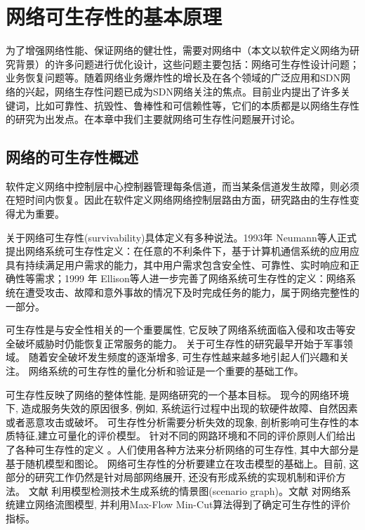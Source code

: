 
\chapter{网络可生存性的基本原理}
为了增强网络性能、保证网络的健壮性，需要对网络中（本文以软件定义网络为研究背景）的许多问题进行优化设计，这些问题主要包括：网络可生存性设计问题；业务恢复问题等。随着网络业务爆炸性的增长及在各个领域的广泛应用和SDN网络的兴起，网络生存性问题已成为SDN网络关注的焦点。目前业内提出了许多关键词，比如可靠性、抗毁性、鲁棒性和可信赖性等，它们的本质都是以网络生存性的研究为出发点。在本章中我们主要就网络可生存性问题展开讨论。



\section{网络的可生存性概述}
软件定义网络中控制层中心控制器管理每条信道，而当某条信道发生故障，则必须在短时间内恢复。因此在软件定义网络网络控制层路由方面，研究路由的生存性变得尤为重要。

关于网络可生存性(survivability)具体定义有多种说法\cite{al2009comparative}。1993年 Neumann\cite{hollway1993survivable}等人正式提出网络系统可生存性定义：在任意的不利条件下，基于计算机通信系统的应用应具有持续满足用户需求的能力，其中用户需求包含安全性、可靠性、实时响应和正确性等需求；1999 年 Ellison\cite{ellison1997survivable}等人进一步完善了网络系统可生存性的定义：网络系统在遭受攻击、故障和意外事故的情况下及时完成任务的能力，属于网络完整性的一部分。


可生存性是与安全性相关的一个重要属性, 它反映了网络系统面临入侵和攻击等安全破坏威胁时仍能恢复正常服务的能力\cite{jha2000survivability}。 关于可生存性的研究最早开始于军事领域\cite{frank1974survivability}。 随着安全破坏发生频度的逐渐增多, 可生存性越来越多地引起人们兴趣和关注。 网络系统的可生存性的量化分析和验证是一个重要的基础工作。


可生存性反映了网络的整体性能, 是网络研究的一个基本目标。 现今的网络环境下, 造成服务失效的原因很多, 例如, 系统运行过程中出现的软硬件故障、自然因素或者恶意攻击或破坏。 可生存性分析需要分析失效的现象, 剖析影响可生存性的本质特征,建立可量化的评价模型。 针对不同的网路环境和不同的评价原则人们给出了各种可生存性的定义\cite{zolfaghari1994framework,liew1994framework,knight2000definitionp} 。人们使用各种方法来分析网络的可生存性, 其中大部分是基于随机模型和图论。 网络可生存性的分析要建立在攻击模型的基础上。目前, 这部分的研究工作仍然是针对局部网络展开, 还没有形成系统的实现机制和评价方法。 文献\cite{frank1974survivability} 利用模型检测技术生成系统的情景图(scenario graph)。文献\cite{frank1974survivability} 对网络系统建立网络流图模型, 并利用Max-Flow Min-Cut算法得到了确定可生存性的评价指标。


